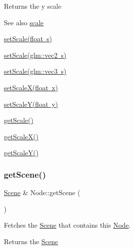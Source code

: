 \begin{DoxyReturn}{Returns}
the y scale 
\end{DoxyReturn}
\begin{DoxySeeAlso}{See also}
\mbox{\hyperlink{classsage_1_1Node_a686c3edeea1faab8b566bfdf2fe3f906}{scale}} 

\mbox{\hyperlink{classsage_1_1Node_a939698b2eb68ee5b60b91e2426e95369}{set\+Scale(float s)}} 

\mbox{\hyperlink{classsage_1_1Node_aecff30b003ce1c2266cc60a34b72559d}{set\+Scale(glm\+::vec2 s)}} 

\mbox{\hyperlink{classsage_1_1Node_a7481b934a6ef259a14aee4d0b87cb2aa}{set\+Scale(glm\+::vec3 s)}} 

\mbox{\hyperlink{classsage_1_1Node_ab8126397f90ccdee0755b984b26809d8}{set\+Scale\+X(float x)}} 

\mbox{\hyperlink{classsage_1_1Node_afa22161545d63e9e011f8eeb5acdead7}{set\+Scale\+Y(float y)}} 

\mbox{\hyperlink{classsage_1_1Node_ac41e15cac1e23a4c48798291c70dcdd8}{get\+Scale()}} 

\mbox{\hyperlink{classsage_1_1Node_a27040ef8ab59ccf42b87d6ddc8d794e6}{get\+Scale\+X()}} 

\mbox{\hyperlink{classsage_1_1Node_ab87661ab8940512baf2e7639ea55ff87}{get\+Scale\+Y()}} 
\end{DoxySeeAlso}
\mbox{\label{classsage_1_1Node_aba969bc78f15ce97c09011b35f61b651}} 
\subsubsection{\texorpdfstring{getScene()}{getScene()}}
{\footnotesize\ttfamily \mbox{\hyperlink{classsage_1_1Scene}{Scene}} \& Node\+::get\+Scene (\begin{DoxyParamCaption}{ }\end{DoxyParamCaption})\hspace{0.3cm}{\ttfamily [virtual]}}



Fetches the \mbox{\hyperlink{classsage_1_1Scene}{Scene}} that contains this \mbox{\hyperlink{classsage_1_1Node}{Node}}. 

\begin{DoxyReturn}{Returns}
the \mbox{\hyperlink{classsage_1_1Scene}{Scene}} 
\end{DoxyReturn}


